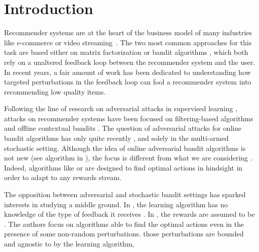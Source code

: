 \section{Introduction}


Recommender systems are at the heart of the business model of many industries like e-commerce or video streaming~\cite{davidson2010youtube,gomez2015netflix}. The two most common approaches for this task are based either on matrix factorization \cite{park2017comparative} or bandit algorithms \cite{li2010contextual}, which both
rely on a unaltered feedback loop between the recommender system and the user. In recent years, a fair amount of work has been dedicated to understanding how targeted perturbations in the feedback loop can fool a recommender system into recommending low quality items.

Following the line of research on adversarial attacks in supervised learning \cite{biggio2012poisoning,goodfellow2014explaining, jagielski2018manipulating, li2016data, liu2017robust}, attacks on recommender systems have been focused on filtering-based algorithms \cite{10.1145/3298689.3347031, mehta2008attack} and offline contextual bandits \cite{ma2018data}.
The question of adversarial attacks for online bandit algorithms %
has only   quite recently \cite{jun2018adversarial, liu2019data, Immorlica2018AdversarialBW, guan2020robust}, and solely in the multi-armed stochastic setting.
Although the idea of online adversarial bandit algorithms is not new (see \expthree algorithm in \cite{auer2002finite}), the focus is different from what we are considering . Indeed, algorithms like \expthree or \expfour \cite{lattimore2018bandit} are designed to find optimal actions in hindsight in order to adapt to any rewards stream. 


 The opposition between adversarial and stochastic bandit settings has sparked interests in studying a middle ground.
 In \cite{bubeck2012best}, the learning algorithm has no knowledge of the type of feedback it receives . In \cite{10.1145/3188745.3188918, li2019stochastic, gupta2019better, Lykouris2019CorruptionRE, kapoor2019corruption}, the rewards are assumed to be . The authors focus on  algorithms able to find the optimal actions even in the presence of some non-random perturbations.  those perturbations are bounded and agnostic to  by the learning algorithm, 

